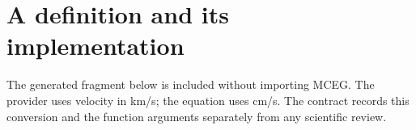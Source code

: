 \documentclass{article}
\begin{document}
\section*{A definition and its implementation}
The generated fragment below is included without importing MCEG. The provider
uses velocity in km/s; the equation uses cm/s. The contract records this
conversion and the function arguments separately from any scientific review.

\end{document}
